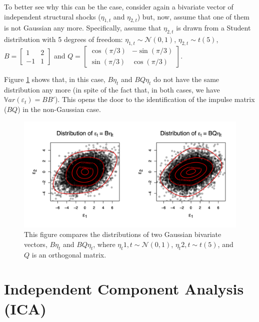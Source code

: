 \documentclass[
  12pt,
]{book}
\theoremstyle{definition}
\theoremstyle{definition}
\theoremstyle{definition}
\theoremstyle{definition}
\theoremstyle{remark}
\begin{document}
To better see why this can be the case, consider again a bivariate vector of independent structural shocks (\(\eta_{1,t}\) and \(\eta_{2,t}\)) but, now, assume that one of them is not Gaussian any more. Specifically, assume that \(\eta_{2,t}\) is drawn from a Student distribution with 5 degrees of freedom:
\(\eta_{1,t} \sim \mathcal{N}(0,1)\), \(\eta_{2,t} \sim t(5)\),
\(B = \left[\begin{array}{cc} 1 & 2 \\ -1 & 1 \end{array}\right]\) and
\(Q = \left[\begin{array}{cc} \cos(\pi/3) & -\sin(\pi/3) \\ \sin(\pi/3) & \cos(\pi/3) \end{array}\right]\).

Figure \ref{fig:preMadeFigureICAGaussianStudent} shows that, in this case, \(B \eta_t\) and \(BQ\eta_t\) do not have the same distribution any more (in spite of the fact that, in both cases, we have \(\mathbb{V}ar(\varepsilon_t)=BB'\)). This opens the door to the identification of the impulse matrix (\(BQ\)) in the non-Gaussian case.

\begin{figure}
\includegraphics[width=0.95\linewidth]{images/Figure_C} \caption{This figure compares the distributions of two Gaussian bivariate vectors, $B \eta_t$ and $BQ\eta_t$, where $\eta_t{1,t} \sim \mathcal{N}(0,1)$, $\eta_t{2,t} \sim t(5)$, and $Q$  is an orthogonal matrix.}\label{fig:preMadeFigureICAGaussianStudent}
\end{figure}

\hypertarget{independent-component-analysis-ica}{%
\section{Independent Component Analysis (ICA)}\label{independent-component-analysis-ica}}
\end{document}
